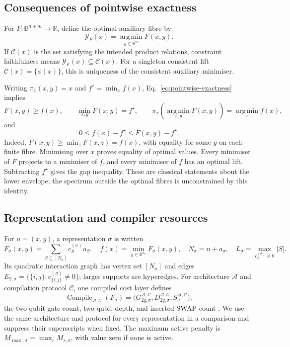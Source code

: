 \documentclass[a4paper,onecolumn,11pt,unpublished]{quantumarticle}
\theoremstyle{remark}
\begin{document}
\subsection{Consequences of pointwise exactness}

For $F:\mathbb B^{n+m}\to\mathbb R$, define the optimal auxiliary fibre by
\begin{equation}
\mathcal Y_F(x)=\operatorname*{arg\,min}_{y\in\mathbb B^m}F(x,y).
\label{eq:optimal-fibre}
\end{equation}
If $\mathcal C(x)$ is the set satisfying the intended product relations,
constraint faithfulness means $\mathcal Y_F(x)\subseteq\mathcal C(x)$.
For a singleton consistent lift $\mathcal C(x)=\{\phi(x)\}$, this is
uniqueness of the consistent auxiliary minimiser.

Writing $\pi_x(x,y)=x$ and $f^\star=\min_x f(x)$,
Eq.~\eqref{eq:pointwise-exactness} implies
\begin{equation}
  F(x,y)\geq f(x),\qquad
  \min_{x,y}F(x,y)=f^\star,\qquad
  \pi_x\!\left(\operatorname*{arg\,min}_{x,y}F(x,y)\right)
  =\operatorname*{arg\,min}_x f(x),
  \label{eq:pointwise-consequences}
\end{equation}
and
\begin{equation}
  0\leq f(x)-f^\star\leq F(x,y)-f^\star.
  \label{eq:gap-ordering}
\end{equation}
Indeed, $F(x,y)\geq\min_zF(x,z)=f(x)$, with equality for some $y$ on
each finite fibre. Minimising over $x$ proves equality of optimal values.
Every minimiser of $F$ projects to a minimiser of $f$, and every minimiser
of $f$ has an optimal lift. Subtracting $f^\star$ gives the gap inequality.
These are classical statements about the lower envelope; the spectrum
outside the optimal fibres is unconstrained by this identity.

\subsection{Representation and compiler resources}
For $u=(x,y)$, a representation $\sigma$ is written
\begin{equation}
  F_\sigma(x,y)=\sum_{S\subseteq[N_\sigma]}c_S^{(\sigma)}u_S,
  \quad f(x)=\min_{y\in\mathbb B^{a_\sigma}}F_\sigma(x,y),
  \quad N_\sigma=n+a_\sigma,
  \quad L_\sigma=\max_{c_S^{(\sigma)}\ne0}|S|.
  \label{eq:representation-data}
\end{equation}
Its quadratic interaction graph has vertex set $[N_\sigma]$ and edges
$E_{2,\sigma}=\{\{i,j\}:c_{\{i,j\}}^{(\sigma)}\ne0\}$;
larger supports are hyperedges. For architecture $\mathcal A$ and
compilation protocol $\mathcal C$, one compiled cost layer defines
\[
  \operatorname{Compile}_{\mathcal A,\mathcal C}(F_\sigma)
  =\bigl(G_{2q,\sigma}^{\mathcal A,\mathcal C},
         D_{2q,\sigma}^{\mathcal A,\mathcal C},
         S_\sigma^{\mathcal A,\mathcal C}\bigr),
\]
the two-qubit gate count, two-qubit depth, and inserted SWAP count
\cite{Weidenfeller2022,Schmidbauer2024,Rovara2026}.
We use the same architecture and protocol for every representation in a
comparison and suppress their superscripts when fixed.
The maximum active penalty is $M_{\max,\sigma}=\max_r M_{r,\sigma}$,
with value zero if none is active.
\end{document}
